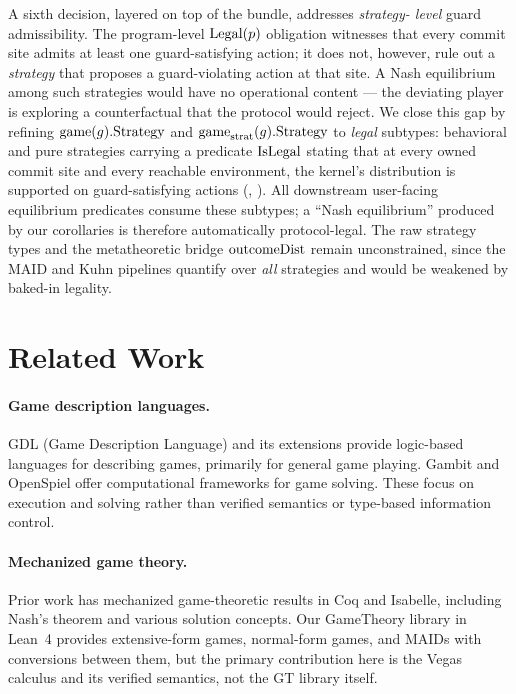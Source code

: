 \documentclass[11pt]{article}
\begin{document}
A sixth decision, layered on top of the bundle, addresses \emph{strategy-
level} guard admissibility. The program-level $\mathrm{Legal}(p)$ obligation
witnesses that every commit site admits at least one guard-satisfying
action; it does not, however, rule out a \emph{strategy} that proposes a
guard-violating action at that site. A Nash equilibrium among such
strategies would have no operational content --- the deviating player is
exploring a counterfactual that the protocol would reject. We close this
gap by refining $\mathrm{game}(g).\mathrm{Strategy}$ and
$\mathrm{game}_{\mathrm{strat}}(g).\mathrm{Strategy}$ to \emph{legal} subtypes: behavioral
and pure strategies carrying a predicate $\mathrm{IsLegal}$ stating that at every
owned commit site and every reachable environment, the kernel's
distribution is supported on guard-satisfying actions
(,
). All downstream user-facing
equilibrium predicates consume these subtypes; a ``Nash equilibrium''
produced by our corollaries is therefore automatically protocol-legal.
The raw strategy types and the metatheoretic bridge $\mathrm{outcomeDist}$ remain
unconstrained, since the MAID and Kuhn pipelines quantify over
\emph{all} strategies and would be weakened by baked-in legality.


\section{Related Work}\label{sec:related}

\paragraph{Game description languages.}
GDL (Game Description Language) and its extensions provide logic-based
languages for describing games, primarily for general game playing. Gambit and
OpenSpiel offer computational frameworks for game solving. These focus on
execution and solving rather than verified semantics or type-based information
control.

\paragraph{Mechanized game theory.}
Prior work has mechanized game-theoretic results in Coq and Isabelle, including
Nash's theorem and various solution concepts. Our GameTheory library in Lean~4
provides extensive-form games, normal-form games, and MAIDs with conversions
between them, but the primary contribution here is the Vegas calculus and its
verified semantics, not the GT library itself.
\end{document}
